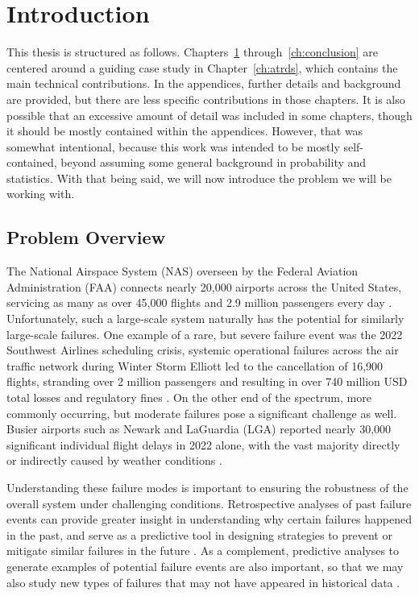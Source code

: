\chapter{Introduction}
\label{ch:intro}

This thesis is structured as follows. Chapters~\ref{ch:intro} through~\ref{ch:conclusion} are centered around a guiding case study in Chapter~\ref{ch:atrds}, which contains the main technical contributions. In the appendices, further details and background are provided, but there are less specific contributions in those chapters. It is also possible that an excessive amount of detail was included in some chapters, though it should be mostly contained within the appendices. However, that was somewhat intentional, because this work was intended to be mostly self-contained, beyond assuming some general background in probability and statistics. With that being said, we will now introduce the problem we will be working with.

\section{Problem Overview}
\label{sec:intro-overview}

The National Airspace System (NAS) overseen by the Federal Aviation Administration (FAA) connects nearly 20,000 airports across the United States, servicing as many as over 45,000 flights and 2.9 million passengers every day \cite{faa_numbers_2024}. Unfortunately, such a large-scale system naturally has the potential for similarly large-scale failures. One example of a rare, but severe failure event was the 2022 Southwest Airlines scheduling crisis, systemic operational failures across the air traffic network during Winter Storm Elliott led to the cancellation of 16,900 flights, stranding over 2 million passengers and resulting in over 740 million USD total losses and regulatory fines \cite{dot_penalizes_2023}. On the other end of the spectrum, more commonly occurring, but moderate failures pose a significant challenge as well. Busier airports such as Newark and LaGuardia (LGA) reported nearly 30,000 significant individual flight delays in 2022 alone, with the vast majority directly or indirectly caused by weather conditions \cite{faa_faq_2024}.

Understanding these failure modes is important to ensuring the robustness of the overall system under challenging conditions. Retrospective analyses of past failure events can provide greater insight in understanding why certain failures happened in the past, and serve as a predictive tool in designing strategies to prevent or mitigate similar failures in the future \cite{michael_peng_probing_2024}. As a complement, predictive analyses to generate examples of potential failure events are also important, so that we may also study new types of failures that may not have appeared in historical data \cite{parashar2024learning}. 


